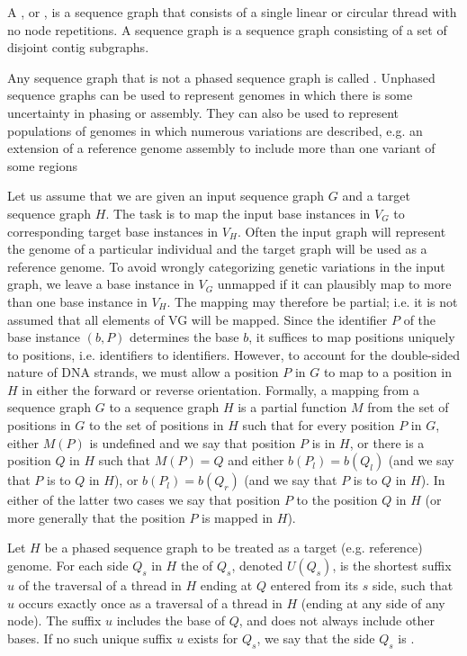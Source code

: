 \documentclass[11pt,proposal]{ucthesis}
\begin{document}
A , or , is a sequence graph that consists of a single linear or circular thread with no node repetitions. A  sequence graph is a sequence graph consisting of a set of disjoint contig subgraphs.

Any sequence graph that is not a phased sequence graph is called . Unphased sequence graphs can be used to represent genomes in which there is some uncertainty in phasing or assembly. They can also be used to represent populations of genomes in which numerous variations are described, e.g. an extension of a reference genome assembly to include more than one variant of some regions

Let us assume that we are given an input sequence graph $G$ and a target sequence graph $H$. The task is to map the input base instances in $V_G$ to corresponding target base instances in $V_H$. Often the input graph will represent the genome of a particular individual and the target graph will be used as a reference genome. To avoid wrongly categorizing genetic variations in the input graph, we leave a base instance in $V_G$ unmapped if it can plausibly map to more than one base instance in $V_H$. The mapping may therefore be partial; i.e. it is not assumed that all elements of VG will be mapped. Since the identifier $P$ of the base instance $(b,P)$ determines the base $b$, it suffices to map positions uniquely to positions, i.e. identifiers to identifiers. However, to account for the double-sided nature of DNA strands, we must allow a position $P$ in $G$ to map to a position in $H$ in either the forward or reverse orientation. Formally, a mapping from a sequence graph $G$ to a sequence graph $H$ is a partial function $M$ from the set of positions in $G$ to the set of positions in $H$ such that for every position $P$ in $G$, either $M(P)$ is undefined and we say that position $P$ is  in $H$, or there is a position $Q$ in $H$ such that $M(P) = Q$ and either $b(P_l) = b(Q_l)$ (and we say that $P$ is  to $Q$ in $H$), or $b(P_l) = b(Q_r)$ (and we say that $P$ is  to $Q$ in $H$). In either of the latter two cases we say that position $P$  to the position $Q$ in $H$ (or more generally that the position $P$ is mapped in $H$).  

Let $H$ be a phased sequence graph to be treated as a target (e.g. reference) genome. For each side $Q_s$ in $H$ the  of $Q_s$, denoted $U(Q_s)$, is the shortest suffix $u$ of the traversal of a thread in $H$ ending at $Q$ entered from its $s$ side, such that $u$ occurs exactly once as a traversal of a thread in $H$ (ending at any side of any node). The suffix $u$ includes the base of $Q$, and does not always include other bases. If no such unique suffix $u$ exists for $Q_s$, we say that the side $Q_s$ is .
\end{document}
